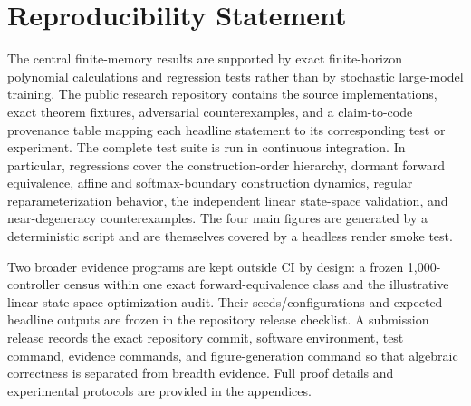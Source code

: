 \section*{Reproducibility Statement}

The central finite-memory results are supported by exact finite-horizon polynomial calculations and regression tests rather than by stochastic large-model training. The public research repository contains the source implementations, exact theorem fixtures, adversarial counterexamples, and a claim-to-code provenance table mapping each headline statement to its corresponding test or experiment. The complete test suite is run in continuous integration. In particular, regressions cover the construction-order hierarchy, dormant forward equivalence, affine and softmax-boundary construction dynamics, regular reparameterization behavior, the independent linear state-space validation, and near-degeneracy counterexamples. The four main figures are generated by a deterministic script and are themselves covered by a headless render smoke test.

Two broader evidence programs are kept outside CI by design: a frozen 1,000-controller census within one exact forward-equivalence class and the illustrative linear-state-space optimization audit. Their seeds/configurations and expected headline outputs are frozen in the repository release checklist. A submission release records the exact repository commit, software environment, test command, evidence commands, and figure-generation command so that algebraic correctness is separated from breadth evidence. Full proof details and experimental protocols are provided in the appendices.
